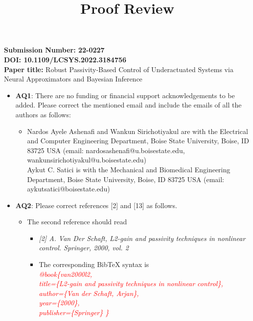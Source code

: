 \documentclass[11pt]{article}
\begin{document}
\title{Proof Review}
\maketitle

\noindent
\textbf{Submission Number: 22-0227}  \\%
\textbf{DOI: 10.1109/LCSYS.2022.3184756} \\
\textbf{Paper title:} Robust Passivity-Based Control of Underactuated Systems via Neural Approximators and Bayesian Inference

\bigskip \bigskip \noindent 
%
\begin{itemize}
    \item \textbf{AQ1}: There are no funding or financial support acknowledgements to be
    added. Please correct the mentioned email and include the emails of all the
    authors as follows:
    \begin{itemize}
        \item Nardos Ayele Ashenafi and Wankun Sirichotiyakul are with the
        Electrical and Computer Engineering Department, Boise State University,
        Boise, ID 83725 USA (email: nardosashenafi@u.boisestate.edu,
        wankunsirichotiyakul@u.boisestate.edu) \\
        Aykut C. Satici is with the Mechanical and Biomedical Engineering
        Department, Boise State University, Boise, ID 83725 USA
        (email: aykutsatici@boisestate.edu)
    \end{itemize}
    \item \textbf{AQ2}: Please correct references [2] and [13] as follows.
    \begin{itemize}
    \item The second reference should read
    \begin{itemize}
        \item \textit{[2] A. Van Der Schaft, L2-gain and passivity techniques in nonlinear control. Springer, 2000, vol. 2}
        \item The corresponding BibTeX syntax is \\
        \textcolor{red}{\textit{@book\{van2000l2,\\
        title=\{L2-gain and passivity techniques in nonlinear control\},\\
        author=\{Van der Schaft, Arjan\},\\
        year=\{2000\},\\
        publisher=\{Springer\}
      \}}}
    \end{itemize} 

\end{itemize}
\end{itemize}
\end{document}
